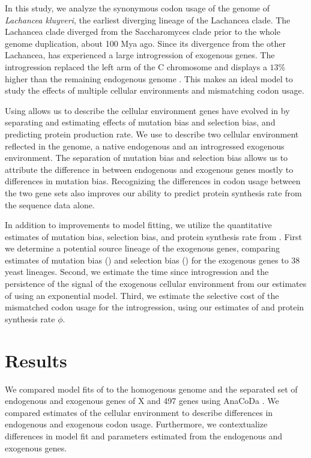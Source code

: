 \documentclass[12pt]{article}
\begin{document}
In this study, we analyze the synonymous codon usage of the genome of \textit{Lachancea kluyveri}, the earliest diverging lineage of the Lachancea clade.
The Lachancea clade diverged from the Saccharomyces clade prior to the whole genome duplication, about 100 Mya ago.
Since its divergence from the other Lachancea, \kluyveri  has experienced a large introgression of exogenous genes.
The introgression replaced the left arm of the C chromosome and displays a $13 \%$ higher \GC than the remaining endogenous \kluyveri genome \citep{payen2009, friedrich2015}.
This makes \kluyveri an ideal model to study the effects of multiple cellular environments and mismatching codon usage.

Using \ROC \cite{gilchrist2015} allows us to describe the cellular environment genes have evolved in by separating and estimating effects of mutation bias and selection bias, and predicting protein production rate.
We use \ROC to describe two cellular environment reflected in the \kluyveri genome, a native endogenous and an introgressed exogenous environment.
The separation of mutation bias and selection bias allows us to attribute the difference in \GC between endogenous and exogenous genes mostly to differences in mutation bias.
Recognizing the differences in codon usage between the two gene sets also improves our ability to predict protein synthesis rate from the sequence data alone.

In addition to improvements to model fitting, we utilize the quantitative estimates of mutation bias, selection bias, and protein synthesis rate from \ROC.
First we determine a potential source lineage of the exogenous genes, comparing estimates of mutation bias (\DM) and selection bias (\DE) for the exogenous genes to 38 yeast lineages.
Second, we estimate the time since introgression and the persistence of the signal of the exogenous cellular environment from our estimates of \DM using an exponential model.
Third, we estimate the selective cost of the mismatched codon usage for the introgression, using our estimates of \DE and protein synthesis rate $\phi$. 

\section*{Results}
We compared model fits of \ROC to the homogenous \kluyveri genome and the separated set of endogenous and exogenous genes of X and 497 genes using AnaCoDa \citep{landerer2018}.
We compared estimates of the cellular environment to describe differences in endogenous and exogenous codon usage.
Furthermore, we contextualize differences in model fit and parameters estimated from the endogenous and exogenous genes.
\end{document}
